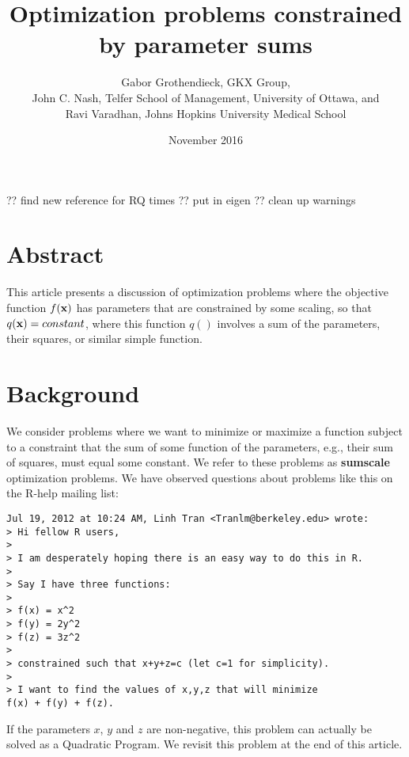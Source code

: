 \documentclass[11pt]{article}\usepackage[]{graphicx}\usepackage[]{color}
\newcommand{\B}[1]{{\bf #1 \rm}}
\begin{document}
?? find new reference for RQ times
?? put in eigen
?? clean up warnings





\title{Optimization problems constrained by parameter sums}
\author{Gabor Grothendieck, GKX Group,\\
John C. Nash, Telfer School of Management, University of Ottawa, and\\
Ravi Varadhan, Johns Hopkins University Medical School}
\date{November 2016}
\maketitle

\section*{Abstract}

This article presents a discussion of optimization problems where the 
objective function $f(\B{x})$ has parameters that are constrained by some
scaling, so that $q(\B{x}) = constant$, where this function $q()$ involves
a sum of the parameters, their squares, or similar simple function.

\section{Background}

We consider problems where we want to minimize or maximize a function subject to a constraint
that the sum of some function of the parameters, e.g., their sum of squares, must 
equal some constant.
We refer to these problems as \B{sumscale} optimization problems. We have observed questions 
about problems like this on the R-help mailing list: 

\begin{verbatim}
Jul 19, 2012 at 10:24 AM, Linh Tran <Tranlm@berkeley.edu> wrote:
> Hi fellow R users,
>
> I am desperately hoping there is an easy way to do this in R.
>
> Say I have three functions:
>
> f(x) = x^2
> f(y) = 2y^2
> f(z) = 3z^2
>
> constrained such that x+y+z=c (let c=1 for simplicity).
>
> I want to find the values of x,y,z that will minimize 
f(x) + f(y) + f(z).
\end{verbatim}

If the parameters $x$, $y$ and $z$ are non-negative, this problem can actually 
be solved as a Quadratic Program. We revisit this problem at the end of this
article.
\end{document}
